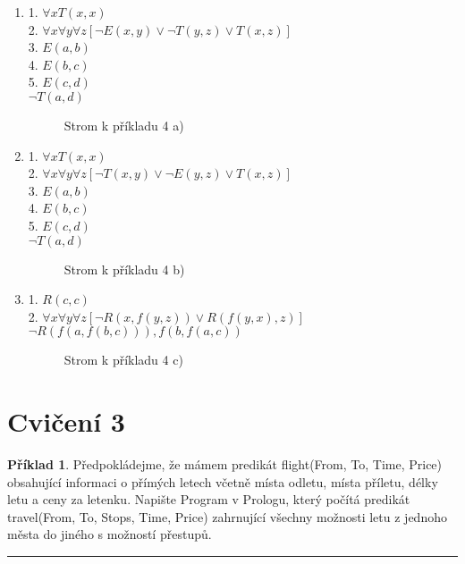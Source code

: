 \documentclass[a4paper]{article}
\theoremstyle{definition}
\newtheorem{priklad}{Příklad}
\begin{document}
\begin{enumerate}
    \item 1. $ \forall xT(x,x) $\\
    2. $ \forall x\forall y\forall z\left[\neg E(x,y)\vee \neg T(y,z)\vee T(x,z)\right] $\\
    3. $ E(a,b) $\\
    4. $ E(b,c) $\\
    5. $ E(c,d) $\\
    $ \neg T(a,d) $

    \begin{figure}[htb]
        \centering
        
        \caption{Strom k příkladu 4 a)}
    \end{figure}

    \item 1. $ \forall xT(x,x) $\\
    2. $ \forall x\forall y\forall z\left[\neg T(x,y)\vee \neg E(y,z)\vee T(x,z)\right] $\\
    3. $ E(a,b) $\\
    4. $ E(b,c) $\\
    5. $ E(c,d) $\\
    $ \neg T(a,d) $

    \begin{figure}[htb]
        \centering
        
        \caption{Strom k příkladu 4 b)}
    \end{figure}

    \item 1. $ R(c,c) $\\
    2. $ \forall x\forall y\forall z\left[\neg R(x,f(y,z))\vee R(f(y,x),z)\right] $\\
    $ \neg R(f(a,f(b,c))),f(b,f(a,c)) $

    \begin{figure}[htb]
        \centering
        
        \caption{Strom k příkladu 4 c)}
    \end{figure}
\end{enumerate}

\newpage
\section*{Cvičení 3}
\setcounter{priklad}{0}
\begin{priklad}
    Předpokládejme, že mámem predikát flight(From, To, Time, Price) obsahující informaci o přímých letech včetně místa odletu, místa příletu, délky letu a ceny za letenku. Napište Program v Prologu, který počítá predikát travel(From, To, Stops, Time, Price) zahrnující všechny možnosti letu z jednoho města do jiného s možností přestupů.
    
\noindent\rule{\linewidth}{.2pt}    
\end{priklad}
\end{document}
